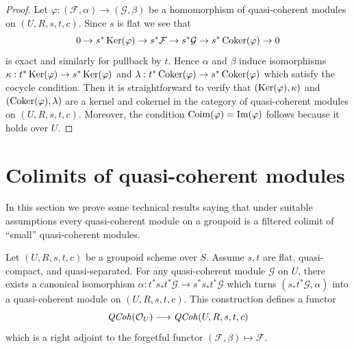 \begin{proof}
Let $\varphi : (\mathcal{F}, \alpha) \to (\mathcal{G}, \beta)$ be a
homomorphism of quasi-coherent modules on $(U, R, s, t, c)$. Since
$s$ is flat we see that
$$
0 \to s^*\mathop{\mathrm{Ker}}(\varphi)
\to s^*\mathcal{F} \to s^*\mathcal{G} \to s^*\mathop{\mathrm{Coker}}(\varphi) \to 0
$$
is exact and similarly for pullback by $t$. Hence $\alpha$ and $\beta$
induce isomorphisms
$\kappa : t^*\mathop{\mathrm{Ker}}(\varphi) \to s^*\mathop{\mathrm{Ker}}(\varphi)$ and
$\lambda : t^*\mathop{\mathrm{Coker}}(\varphi) \to s^*\mathop{\mathrm{Coker}}(\varphi)$
which satisfy the cocycle condition. Then it is straightforward to
verify that $(\mathop{\mathrm{Ker}}(\varphi), \kappa)$ and
$(\mathop{\mathrm{Coker}}(\varphi), \lambda)$ are a kernel and cokernel in the
category of quasi-coherent modules on $(U, R, s, t, c)$. Moreover,
the condition $\mathop{\mathrm{Coim}}(\varphi) = \mathop{\mathrm{Im}}(\varphi)$ follows
because it holds over $U$.
\end{proof}













\section{Colimits of quasi-coherent modules}
\label{section-colimits}

\noindent
In this section we prove some technical results saying that under
suitable assumptions every quasi-coherent module on a groupoid is
a filtered colimit of ``small'' quasi-coherent modules.

\begin{lemma}
\label{lemma-construct-quasi-coherent}
Let $(U, R, s, t, c)$ be a groupoid scheme over $S$.
Assume $s, t$ are flat, quasi-compact, and quasi-separated.
For any quasi-coherent module $\mathcal{G}$ on $U$, there exists
a canonical isomorphism
$\alpha : t^*s_*t^*\mathcal{G} \to s^*s_*t^*\mathcal{G}$
which turns $(s_*t^*\mathcal{G}, \alpha)$ into a quasi-coherent module
on $(U, R, s, t, c)$. This construction defines a functor
$$
\mathit{QCoh}(\mathcal{O}_U) \longrightarrow \mathit{QCoh}(U, R, s, t, c)
$$
which is a right adjoint to the forgetful functor
$(\mathcal{F}, \beta) \mapsto \mathcal{F}$.
\end{lemma}

